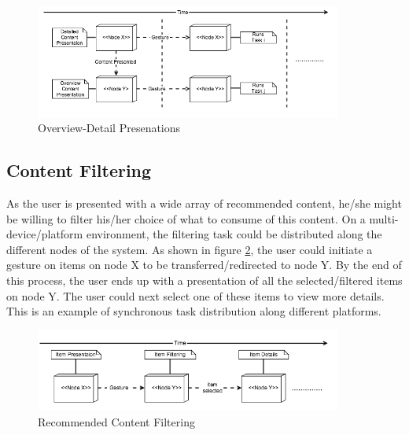 \begin{figure}[h!]
\includegraphics[width=0.9\textwidth, inner, center]{generic3}
\caption{Overview-Detail Presenations}
\label{fig:figure33}
\end{figure}


\subsection{Content Filtering}
As the user is presented with a wide array of recommended content, he/she might be willing to filter his/her choice of what to consume of this content. On a multi-device/platform environment, the filtering task could be distributed along the different nodes of the system. As shown in figure \ref{fig:figure34}, the user could initiate a gesture on items on node X to be transferred/redirected to node Y. By the end of this process, the user ends up with a presentation of all the selected/filtered items on node Y. The user could next select one of these items to view more details. This is an example of synchronous task distribution along different platforms.
  
\begin{figure}[h!]
\includegraphics[width=0.9\textwidth, inner, center]{generic4}
\caption{Recommended Content Filtering}
\label{fig:figure34}
\end{figure}

